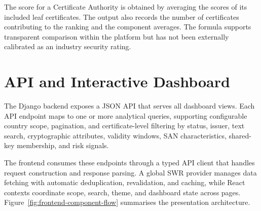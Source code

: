 The score for a Certificate Authority is obtained by averaging the scores of
its included leaf certificates. The output also records the number of
certificates contributing to the ranking and the component averages. The
formula supports transparent comparison within the platform but has not been
externally calibrated as an industry security rating.

\section{API and Interactive Dashboard}
\label{sec:django-api-design-filtering}

The Django backend exposes a JSON API that serves all dashboard views. Each
API endpoint maps to one or more analytical queries, supporting configurable
country scope, pagination, and certificate-level filtering by status, issuer,
text search, cryptographic attributes, validity windows, SAN characteristics,
shared-key membership, and risk signals.

The frontend consumes these endpoints through a typed API client that handles
request construction and response parsing. A global SWR provider manages data
fetching with automatic deduplication, revalidation, and caching, while React
contexts coordinate scope, search, theme, and dashboard state across pages.
Figure~\ref{fig:frontend-component-flow} summarises the presentation
architecture.

